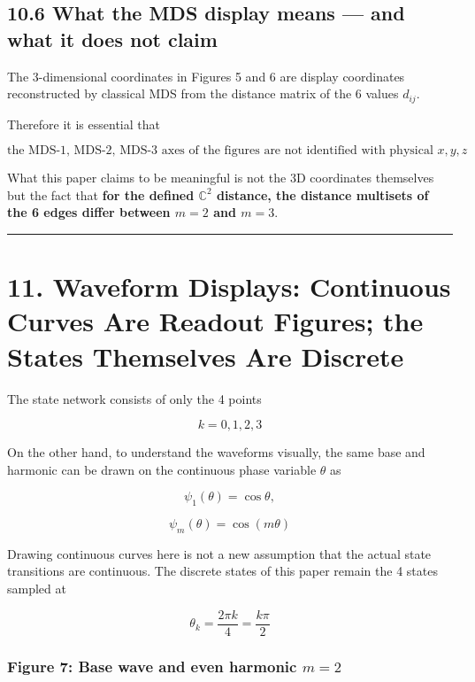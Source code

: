 \documentclass[
  a4paper,
]{article}
\begin{document}
\subsection{10.6 What the MDS display means --- and what it does not
claim}\label{what-the-mds-display-means-and-what-it-does-not-claim}

The 3-dimensional coordinates in Figures 5 and 6 are display coordinates
reconstructed by classical MDS from the distance matrix of the 6 values
\(d_{ij}\).

Therefore it is essential that

\[
\boxed{
\text{the MDS-1, MDS-2, MDS-3 axes of the figures are not identified with physical }x,y,z
}
\]

What this paper claims to be meaningful is not the 3D coordinates
themselves but the fact that \textbf{for the defined \(\mathbb C^2\)
distance, the distance multisets of the 6 edges differ between \(m=2\)
and \(m=3\)}.

\begin{center}\rule{0.5\linewidth}{0.5pt}\end{center}

\section{11. Waveform Displays: Continuous Curves Are Readout Figures;
the States Themselves Are
Discrete}\label{waveform-displays-continuous-curves-are-readout-figures-the-states-themselves-are-discrete}

The state network consists of only the 4 points

\[
k=0,1,2,3
\]

On the other hand, to understand the waveforms visually, the same base
and harmonic can be drawn on the continuous phase variable \(\theta\) as

\[
\psi_1(\theta)=\cos\theta,
\]

\[
\psi_m(\theta)=\cos(m\theta)
\]

Drawing continuous curves here is not a new assumption that the actual
state transitions are continuous. The discrete states of this paper
remain the 4 states sampled at

\[
\theta_k
=
\frac{2\pi k}{4}
=
\frac{k\pi}{2}
\]

\subsubsection{\texorpdfstring{Figure 7: Base wave and even harmonic
\(m=2\)}{Figure 7: Base wave and even harmonic m=2}}\label{figure-7-base-wave-and-even-harmonic-m2}
\end{document}
